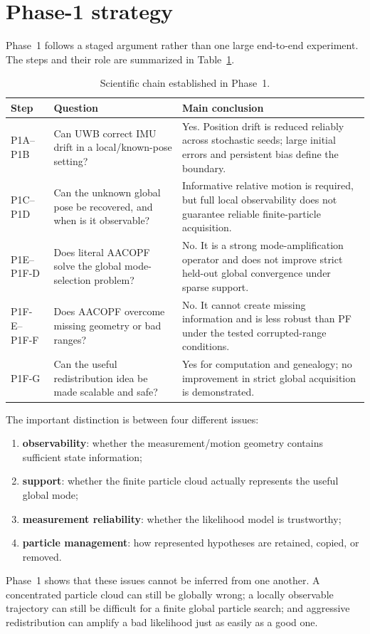 \section{Phase-1 strategy}

Phase~1 follows a staged argument rather than one large end-to-end experiment. The steps and their role are summarized in Table~\ref{tab:summary_chain}.

\begin{table}[htbp]
    \centering
    \caption{Scientific chain established in Phase~1.}
    \label{tab:summary_chain}
    \begin{tabular}{p{}p{}p{}}
        \toprule
        Step & Question & Main conclusion\\
        \midrule
        P1A--P1B & Can UWB correct IMU drift in a local/known-pose setting? & Yes. Position drift is reduced reliably across stochastic seeds; large initial errors and persistent bias define the boundary.\\
        P1C--P1D & Can the unknown global pose be recovered, and when is it observable? & Informative relative motion is required, but full local observability does not guarantee reliable finite-particle acquisition.\\
        P1E--P1F-D & Does literal AACOPF solve the global mode-selection problem? & No. It is a strong mode-amplification operator and does not improve strict held-out global convergence under sparse support.\\
        P1F-E--P1F-F & Does AACOPF overcome missing geometry or bad ranges? & No. It cannot create missing information and is less robust than PF under the tested corrupted-range conditions.\\
        P1F-G & Can the useful redistribution idea be made scalable and safe? & Yes for computation and genealogy; no improvement in strict global acquisition is demonstrated.\\
        \bottomrule
    \end{tabular}
\end{table}

The important distinction is between four different issues:
\begin{enumerate}
    \item \textbf{observability}: whether the measurement/motion geometry contains sufficient state information;
    \item \textbf{support}: whether the finite particle cloud actually represents the useful global mode;
    \item \textbf{measurement reliability}: whether the likelihood model is trustworthy;
    \item \textbf{particle management}: how represented hypotheses are retained, copied, or removed.
\end{enumerate}
Phase~1 shows that these issues cannot be inferred from one another. A concentrated particle cloud can still be globally wrong; a locally observable trajectory can still be difficult for a finite global particle search; and aggressive redistribution can amplify a bad likelihood just as easily as a good one.
